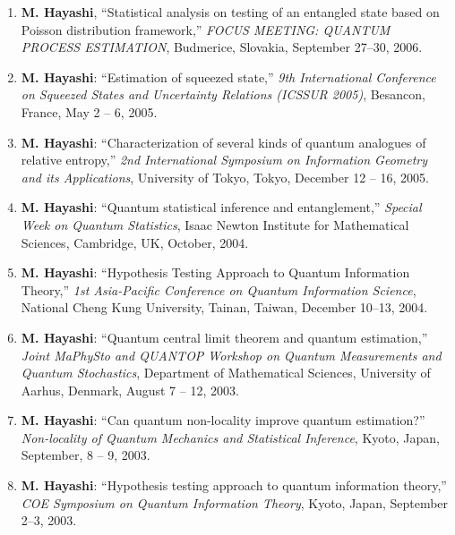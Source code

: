 \documentclass[a4paper,12pt,oneside]{article}
\begin{document}
\begin{enumerate}
\item
\textbf{M. Hayashi}, ``Statistical analysis on testing of an entangled state based on Poisson distribution framework,'' 
{\em FOCUS MEETING: QUANTUM PROCESS ESTIMATION}, 
Budmerice, Slovakia, September 27--30, 2006.

\item
\textbf{M. Hayashi}: ``Estimation of squeezed state,'' 
{\em 9th International Conference on Squeezed States and Uncertainty Relations (ICSSUR 2005)}, Besancon, France, May 2 -- 6,  2005.

\item
\textbf{M. Hayashi}: ``Characterization of several kinds of quantum analogues of relative entropy,'' 
{\em 2nd International Symposium on Information Geometry and its Applications}, 
University of Tokyo, Tokyo, December 12 -- 16,  2005.

\item
\textbf{M. Hayashi}: ``Quantum statistical inference and entanglement,'' 
{\em Special Week on Quantum Statistics}, Isaac Newton Institute for Mathematical Sciences, Cambridge, UK, October, 2004.

\item
\textbf{M. Hayashi}: ``Hypothesis Testing Approach to Quantum Information Theory,'' 
{\em 1st Asia-Pacific Conference on Quantum Information Science}, 
National Cheng Kung University, Tainan, Taiwan,
December 10--13, 2004.


\item
\textbf{M. Hayashi}: ``Quantum central limit theorem and quantum estimation,'' 
{\em Joint MaPhySto and QUANTOP Workshop on Quantum Measurements and Quantum Stochastics}, 
Department of Mathematical Sciences, University of Aarhus, Denmark, August 7 -- 12, 2003.

\item
\textbf{M. Hayashi}: ``Can quantum non-locality improve quantum estimation?'' 
{\em Non-locality of Quantum Mechanics and Statistical Inference}, Kyoto, 
Japan, September, 8 -- 9, 2003.

\item
\textbf{M. Hayashi}: ``Hypothesis testing approach to quantum information theory,'' 
{\em COE Symposium on Quantum Information Theory}, Kyoto, Japan, September 2--3, 2003.

\end{enumerate}
\end{document}
